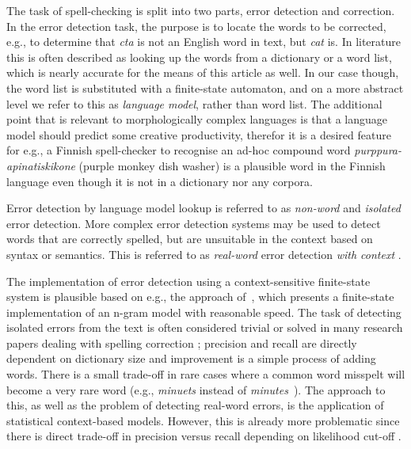 \documentclass[a4paper,12pt]{article}
\begin{document}
The task of spell-checking is split into two parts, error detection and
correction. In the error detection task, the purpose is to locate the words to
be corrected, e.g., to determine that \emph{cta} is not an English word in text, 
but \emph{cat} is. In literature this is often described as looking up the
words from a dictionary or a word list, which is nearly accurate for the means
of this article as well. In our case though, the word list is substituted with
a finite-state automaton, and on a more abstract level we refer to this as
\emph{language model}, rather than word list. The additional point that is
relevant to morphologically complex languages is that a language model should
predict some creative productivity, therefor it is a desired feature for e.g.,
a Finnish spell-checker to recognise an ad-hoc compound word
\emph{purppura-apinatiskikone} (purple monkey dish washer) is a plausible word
in the Finnish language even though it is not in a dictionary nor any corpora.

Error detection by language model lookup is referred to as \emph{non-word} and
\emph{isolated} error detection. More complex error detection systems may be
used to detect words that are correctly spelled, but are unsuitable in the
context based on syntax or semantics. This is referred to as \emph{real-word}
error detection \emph{with context} \cite[]{mays/1991}.

The implementation of error detection using a context-sensitive finite-state
system is plausible based on e.g., the approach of~\cite{silfverberg/2010},
which presents a finite-state implementation of an n-gram model with reasonable
speed. The task of detecting isolated errors from the text is often considered
trivial or solved in many research papers dealing with spelling correction
\cite[e.g.][]{otero/2007}; precision and recall are directly dependent on
dictionary size and improvement is a simple process of adding words. There is
a small trade-off in rare cases where a common word misspelt will become a very
rare word (e.g., \emph{minuets} instead of
\emph{minutes}~\cite[]{kukich1992techniques}). The approach to this, as well as
the problem of detecting real-word errors, is the application of statistical
context-based models. However, this is already more problematic since there is
direct trade-off in precision versus recall depending on likelihood cut-off
\cite[]{hirst2008evaluation,wilcoxohearn2008realword}.
\end{document}
